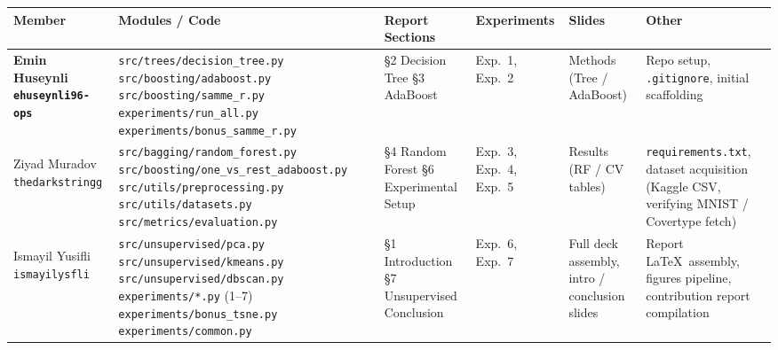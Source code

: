 \documentclass[11pt,a4paper]{article}
\begin{document}
\renewcommand{\arraystretch}{1.4}
\begin{longtable}{>{\bfseries}p{3cm} p{3.8cm} p{2.6cm} p{2.4cm} p{2cm} p{2cm}}
\toprule
Member & Modules / Code & Report Sections & Experiments & Slides & Other \\
\midrule
\endhead

Emin Huseynli\newline
{\normalfont\small\texttt{ehuseynli96-ops}} &
\texttt{src/trees/decision\_tree.py}\newline
\texttt{src/boosting/adaboost.py}\newline
\texttt{src/boosting/samme\_r.py}\newline
\texttt{experiments/run\_all.py}\newline
\texttt{experiments/bonus\_samme\_r.py} &
\S2 Decision Tree\newline
\S3 AdaBoost &
Exp.\ 1, Exp.\ 2 &
Methods (Tree / AdaBoost) &
Repo setup, \texttt{.gitignore}, initial scaffolding \\

\midrule

Ziyad Muradov\newline
{\normalfont\small\texttt{thedarkstringg}} &
\texttt{src/bagging/random\_forest.py}\newline
\texttt{src/boosting/one\_vs\_rest\_adaboost.py}\newline
\texttt{src/utils/preprocessing.py}\newline
\texttt{src/utils/datasets.py}\newline
\texttt{src/metrics/evaluation.py} &
\S4 Random Forest\newline
\S6 Experimental Setup &
Exp.\ 3, Exp.\ 4, Exp.\ 5 &
Results (RF / CV tables) &
\texttt{requirements.txt}, dataset acquisition (Kaggle CSV, verifying MNIST / Covertype fetch) \\

\midrule

Ismayil Yusifli\newline
{\normalfont\small\texttt{ismayilysfli}} &
\texttt{src/unsupervised/pca.py}\newline
\texttt{src/unsupervised/kmeans.py}\newline
\texttt{src/unsupervised/dbscan.py}\newline
\texttt{experiments/*.py} (1--7)\newline
\texttt{experiments/bonus\_tsne.py}\newline
\texttt{experiments/common.py} &
\S1 Introduction\newline
\S7 Unsupervised\newline
Conclusion &
Exp.\ 6, Exp.\ 7 &
Full deck assembly, intro / conclusion slides &
Report \LaTeX\ assembly, figures pipeline, contribution report compilation \\

\bottomrule
\end{longtable}
\end{document}
